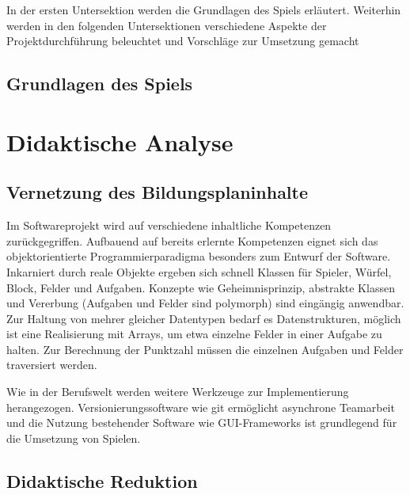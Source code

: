 \documentclass[a4paper,12pt]{article}
\begin{document}
    In der ersten Untersektion werden die Grundlagen des Spiels erläutert.
    Weiterhin werden in den folgenden Untersektionen verschiedene 
    Aspekte der Projektdurchführung beleuchtet und Vorschläge zur Umsetzung gemacht


\subsection{Grundlagen des Spiels}



\section{Didaktische Analyse}

\subsection{Vernetzung des Bildungsplaninhalte}

    Im Softwareprojekt wird auf verschiedene inhaltliche Kompetenzen zurückgegriffen.
    Aufbauend auf bereits erlernte Kompetenzen eignet sich das 
    objektorientierte Programmierparadigma besonders zum Entwurf der Software.
    Inkarniert durch reale Objekte ergeben sich schnell Klassen für Spieler, Würfel,
    Block, Felder und Aufgaben.
    Konzepte wie Geheimnisprinzip, abstrakte Klassen und Vererbung (Aufgaben und Felder sind polymorph) 
    sind eingängig anwendbar.
    Zur Haltung von mehrer gleicher Datentypen bedarf es Datenstrukturen,
    möglich ist eine Realisierung mit Arrays, um etwa einzelne Felder in einer Aufgabe zu halten.
    Zur Berechnung der Punktzahl müssen die einzelnen Aufgaben und Felder traversiert werden.

    Wie in der Berufswelt werden weitere Werkzeuge zur Implementierung herangezogen.
    Versionierungssoftware wie git ermöglicht asynchrone Teamarbeit 
    und die Nutzung bestehender Software wie GUI-Frameworks ist grundlegend
    für die Umsetzung von Spielen.

\subsection{Didaktische Reduktion}
\end{document}
